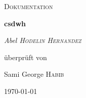 \begin{titlepage}
	\thispagestyle{firstpage}
	
	\centering
	\vspace*{5cm}
	{\scshape\LARGE Dokumentation\par}
	\vspace{1.5cm}
	{\huge \bfseries \ac{csdwh}\par}
	\vspace{2cm}
	{\Large \itshape Abel \textsc{Hodelin Hernandez}\par} 
	\vspace{2cm}
	überprüft von\par
	Sami George \textsc{Habib}
	\vfill
	
	{\large \today\par}
\end{titlepage}